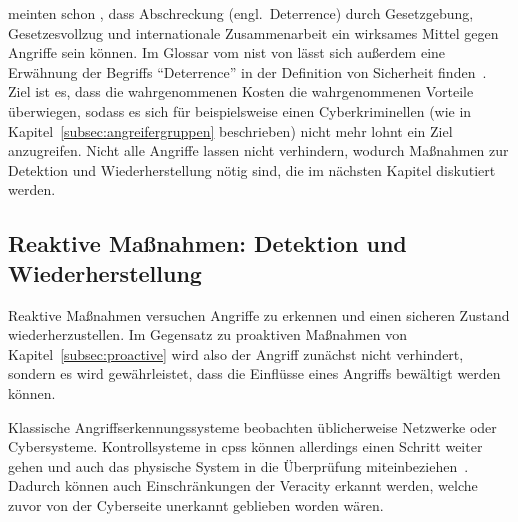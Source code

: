 \documentclass[final,bibliography=totocnumbered]{include/sikseminar}
\newcommand{\cps}{\glspl{cps}\xspace}
\begin{document}
\citeauthor{CAS+09} meinten schon \citeyear{CAS+09}, dass Abschreckung (engl.\ Deterrence) durch Gesetzgebung, Gesetzesvollzug und internationale Zusammenarbeit ein wirksames Mittel gegen Angriffe sein können.
Im Glossar vom \gls{nist} von \citeyear{Kissel13} lässt sich außerdem eine Erwähnung der Begriffs \enquote{Deterrence} in der Definition von Sicherheit finden~\cite{Kissel13}.
Ziel ist es, dass die wahrgenommenen Kosten die wahrgenommenen Vorteile überwiegen, sodass es sich für beispielsweise einen Cyberkriminellen (wie in Kapitel~\ref{subsec:angreifergruppen} beschrieben) nicht mehr lohnt ein Ziel anzugreifen.
Nicht alle Angriffe lassen nicht verhindern, wodurch Maßnahmen zur Detektion und Wiederherstellung nötig sind, die im nächsten Kapitel diskutiert werden.


\subsection{Reaktive Maßnahmen: Detektion und Wiederherstellung}\label{subsec:reactive}

Reaktive Maßnahmen versuchen Angriffe zu erkennen und einen sicheren Zustand wiederherzustellen.
Im Gegensatz zu proaktiven Maßnahmen von Kapitel~\ref{subsec:proactive} wird also der Angriff zunächst nicht verhindert, sondern es wird gewährleistet, dass die Einflüsse eines Angriffs bewältigt werden können.

Klassische Angriffserkennungssysteme beobachten üblicherweise Netzwerke oder Cybersysteme.
Kontrollsysteme in \cps können allerdings einen Schritt weiter gehen und auch das physische System in die Überprüfung miteinbeziehen~\cite{CAS+09}.
Dadurch können auch Einschränkungen der Veracity erkannt werden, welche zuvor von der Cyberseite unerkannt geblieben worden wären.
\end{document}
